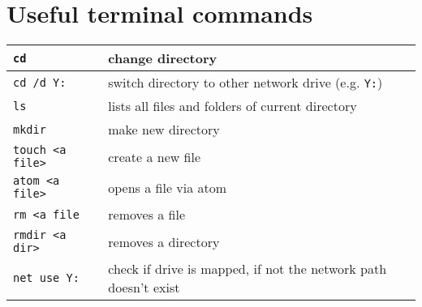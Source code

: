 \documentclass[12pt, twoside]{article}
\begin{document}
	
	\section{Useful terminal commands}
	
	\begin{center}
		\begin{tabular}{l|l}
			\verb|cd| & change directory \\ \hline
			\verb|cd /d Y:| & switch directory to other network drive (e.g. \verb|Y:|)\\ \hline
			\verb|ls| & lists all files and folders of current directory \\ \hline
			\verb|mkdir| & make new directory \\ \hline
			\verb|touch <a file>| & create a new file \\ \hline
			\verb|atom <a file>| & opens a file via atom \\ \hline
			\verb|rm <a file| & removes a file \\ \hline
			\verb|rmdir <a dir>| & removes a directory \\ \hline
			\verb|net use Y:| & check if drive is mapped, if not the network path doesn't exist
		\end{tabular}
	\end{center}
	
\end{document}
